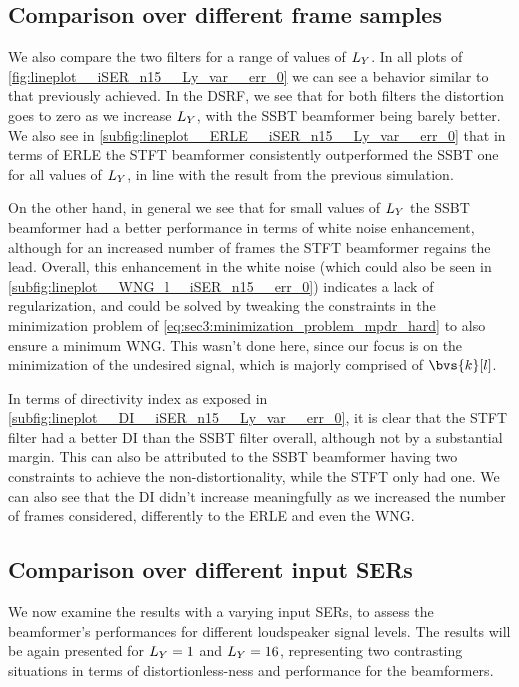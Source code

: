 \subsection{Comparison over different frame samples}
\label{subsec:sec4:comparison_different_Ly}

We also compare the two filters for a range of values of $\Ly$. In all plots of \cref{fig:lineplot__iSER_n15__Ly_var__err_0} we can see a behavior similar to that previously achieved. In the DSRF, we see that for both filters the distortion goes to zero as we increase $\Ly$, with the SSBT beamformer being barely better. We also see in \cref{subfig:lineplot__ERLE__iSER_n15__Ly_var__err_0} that in terms of ERLE the STFT beamformer consistently outperformed the SSBT one for all values of $\Ly$, in line with the result from the previous simulation.

On the other hand, in general we see that for small values of $\Ly$ the SSBT beamformer had a better performance in terms of white noise enhancement, although for an increased number of frames the STFT beamformer regains the lead. Overall, this enhancement in the white noise (which could also be seen in \cref{subfig:lineplot__WNG_l__iSER_n15__err_0}) indicates a lack of regularization, and could be solved by tweaking the constraints in the minimization problem of \cref{eq:sec3:minimization_problem_mpdr_hard} to also ensure a minimum WNG. This wasn't done here, since our focus is on the minimization of the undesired signal, which is majorly comprised of $\bvs{k}[l]$.

In terms of directivity index as exposed in \cref{subfig:lineplot__DI__iSER_n15__Ly_var__err_0}, it is clear that the STFT filter had a better DI than the SSBT filter overall, although not by a substantial margin. This can also be attributed to the SSBT beamformer having two constraints to achieve the non-distortionality, while the STFT only had one. We can also see that the DI didn't increase meaningfully as we increased the number of frames considered, differently to the ERLE and even the WNG.

\subsection{Comparison over different input SERs}

We now examine the results with a varying input SERs, to assess the beamformer's performances for different loudspeaker signal levels. The results will be again presented for $\Ly = 1$ and $\Ly = 16$, representing two contrasting situations in terms of distortionless-ness and performance for the beamformers.

